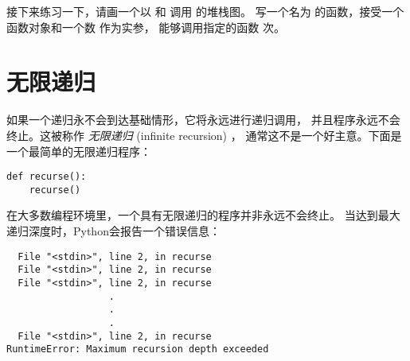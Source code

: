 {{{{接下来练习一下，请画一个以  和  调用  的堆栈图。 写一个名为  的函数，接受一个函数对象和一个数  作为实参， 能够调用指定的函数  次。

\section{无限递归}

  
    

  
    


如果一个递归永不会到达基础情形，它将永远进行递归调用，
并且程序永远不会终止。这被称作 {\em 无限递归} (infinite recursion) ，
通常这不是一个好主意。下面是一个最简单的无限递归程序：

\begin{lstlisting}
def recurse():
    recurse()
\end{lstlisting}

%

在大多数编程环境里，一个具有无限递归的程序并非永远不会终止。
当达到最大递归深度时，Python会报告一个错误信息：
  

\begin{lstlisting}
  File "<stdin>", line 2, in recurse
  File "<stdin>", line 2, in recurse
  File "<stdin>", line 2, in recurse
                  .
                  .
                  .
  File "<stdin>", line 2, in recurse
RuntimeError: Maximum recursion depth exceeded
\end{lstlisting}

%

}}}}
